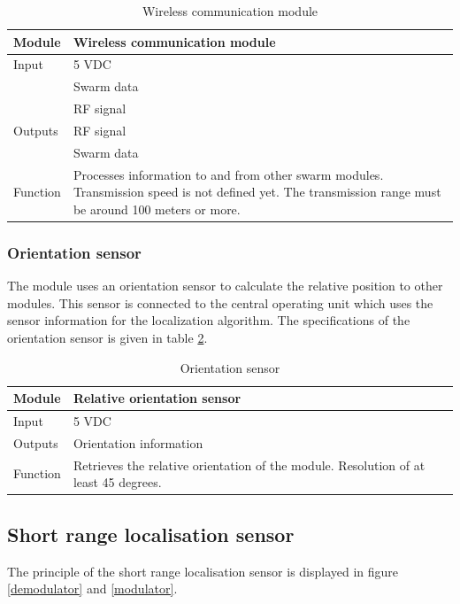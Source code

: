 \documentclass[10pt,a4paper]{article}
\begin{document}
\begin{table}[H]
\centering
\caption{Wireless communication module}
\label{wcm}
\begin{tabular}{|p{}|p{}|}
\hline
Module   & Wireless communication module                                       \\ \hline
Input    & 5 VDC\\ 
        & Swarm data\\
        & RF signal                                              \\ \hline
Outputs  & RF signal                                           \\ 
& Swarm data \\ \hline
Function & Processes information to and from other swarm modules. Transmission speed is not defined yet. The transmission range must be around 100 meters or more. \\ \hline
\end{tabular}
\end{table}

\subsubsection{Orientation sensor}
The module uses an orientation sensor to calculate the relative position to other modules. This sensor is connected to the central operating unit which uses the sensor information for the localization algorithm. The specifications of the orientation sensor is given in table \ref{orisensor}.

\begin{table}[H]
\centering
\caption{Orientation sensor}
\label{orisensor}
\begin{tabular}{|p{}|p{}|}
\hline
Module   & Relative orientation sensor                                        \\ \hline
Input    & 5 VDC                                             \\ \hline
Outputs  & Orientation information                                           \\ \hline
Function & Retrieves the relative orientation of the module. Resolution of at least 45 degrees. \\ \hline
\end{tabular}
\end{table}


\subsection{Short range localisation sensor}
The principle of the short range localisation sensor is displayed in figure \ref{demodulator} and \ref{modulator}.
\end{document}
